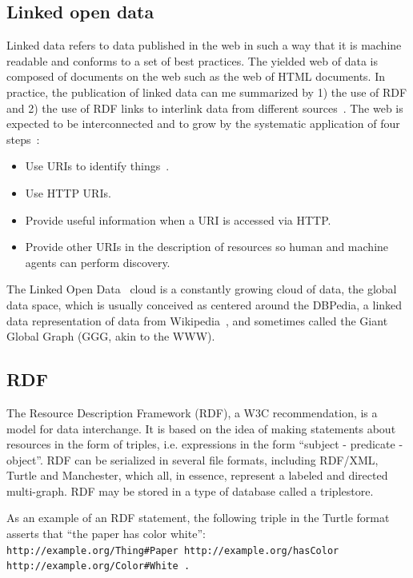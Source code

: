 \documentclass[data,datadescriptor,submit,moreauthors,pdftex]{Definitions/mdpi}
\begin{document}
\subsection{Linked open data}
Linked data refers to data published in the web in such a way that it is
machine readable and conforms to a set of best practices.
The yielded web of data is composed of documents on the web
such as the web of HTML documents.
In practice, the publication of linked data can me summarized
by 1) the use of RDF and 2) the use of RDF
links to interlink data from different sources~\cite{ld1,ld2}.
The web is expected to be interconnected and to
grow by the systematic application of four
steps~\cite{lee1}:
\begin{itemize}
    \item Use URIs to identify things~\cite{uri}.
    \item Use HTTP URIs.
    \item Provide useful information when a URI is accessed via HTTP.
    \item Provide other URIs in the description of resources so human
        and machine agents can perform discovery.
\end{itemize}

The Linked Open Data~\cite{lod} cloud is a constantly growing cloud of data,
the global data space, which is usually
conceived as centered around the DBPedia, a linked data representation
of data from Wikipedia~\cite{dbpedia0,dbpedia},
and sometimes called the Giant Global Graph (GGG, akin to the WWW).

\subsection{RDF}
The Resource Description Framework (RDF), a W3C
recommendation, is a model for data
interchange.
It is based on the idea of making statements about resources in the form
of triples, i.e. expressions in the form ``subject - predicate -
object''.
RDF can be serialized in several file formats, including RDF/XML,
Turtle and Manchester, which all, in essence, represent a labeled and
directed multi-graph.
RDF may be stored in a type of database called a triplestore.~\cite{rdf}

As an example of an RDF statement, the following triple in the Turtle
format asserts that ``the paper has color white'':\\
\texttt{http://example.org/Thing\#Paper http://example.org/hasColor\\
http://example.org/Color\#White .}
\end{document}
